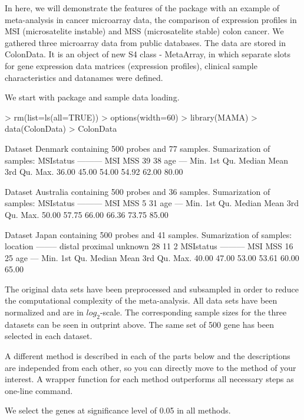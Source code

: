 \documentclass[a4paper]{report}
\begin{document}
In here, we will demonstrate the features of the package with an example of meta-analysis in cancer microarray data, the comparison of expression profiles in MSI (microsatelite instable) and MSS (microsatelite stable) colon cancer. We gathered three microarray data from public databases. The data are stored in {\ttfamily ColonData}. It is an object of new S4 class - {\ttfamily MetaArray}, in which separate slots for gene expression data matrices (expression profiles), clinical sample characteristics and datanames were defined. \par
We start with package and sample data loading. 
\begin{Schunk}
\begin{Sinput}
> rm(list=ls(all=TRUE))
> options(width=60)
> library(MAMA)
> data(ColonData)
> ColonData
\end{Sinput}
\begin{Soutput}
Dataset Denmark  containing 500 probes and  77 samples. 
Sumarization of samples: 
MSIstatus 
--------- 
MSI MSS 
 39  38 
age 
--- 
   Min. 1st Qu.  Median    Mean 3rd Qu.    Max. 
  36.00   45.00   54.00   54.92   62.00   80.00 

Dataset Australia  containing 500 probes and  36 samples. 
Sumarization of samples: 
MSIstatus 
--------- 
MSI MSS 
  5  31 
age 
--- 
   Min. 1st Qu.  Median    Mean 3rd Qu.    Max. 
  50.00   57.75   66.00   66.36   73.75   85.00 

Dataset Japan  containing 500 probes and  41 samples. 
Sumarization of samples: 
location 
-------- 
  distal proximal  unknown 
      28       11        2 
MSIstatus 
--------- 
MSI MSS 
 16  25 
age 
--- 
   Min. 1st Qu.  Median    Mean 3rd Qu.    Max. 
  40.00   47.00   53.00   53.61   60.00   65.00 
\end{Soutput}
\end{Schunk}
The original data sets have been preprocessed and subsampled in order to reduce the computational complexity of the meta-analysis. All data sets have been normalized and are in $log_2$-scale. The corresponding sample sizes for the three datasets can be seen in outprint above. The same set of 500 gene has been selected in each dataset.\par 
A different method is described in each of the parts below and the descriptions are independed from each other, so you can directly move to the method of your interest. %
A wrapper function for each method outperforms all necessary steps as one-line command.\par
We select the genes at significance level of 0.05 in all methods. 
 
\end{document}
